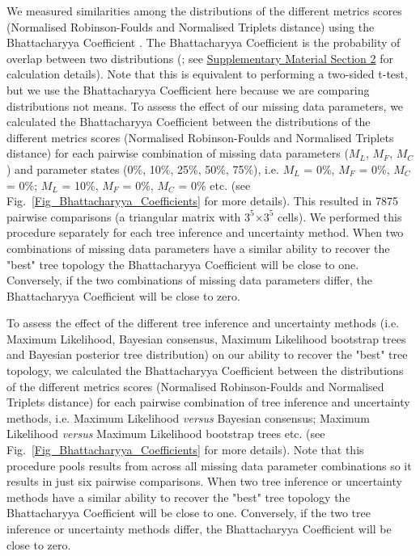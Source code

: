 \documentclass[12pt,letterpaper]{article}
\begin{document}
We measured similarities among the distributions of the different metrics scores (Normalised Robinson-Foulds and Normalised Triplets distance) using the Bhattacharyya Coefficient \citep{Bhattacharyya}. The Bhattacharyya Coefficient is the probability of overlap between two distributions (\citealt{Bhattacharyya}; see \hyperref[SupplementaryMaterial]{Supplementary Material Section 2} for calculation details). Note that this is  equivalent to performing a two-sided t-test, but we use the Bhattacharyya Coefficient here because we are comparing distributions not means. To assess the effect of our missing data parameters, we calculated the Bhattacharyya Coefficient between the distributions of the different metrics scores (Normalised Robinson-Foulds and Normalised Triplets distance) for each pairwise combination of missing data parameters ($M_{L}$, $M_{F}$, $M_{C}$) and parameter states (0\%, 10\%, 25\%, 50\%, 75\%), i.e. $M_{L}$ = 0\%, $M_{F}$ = 0\%, $M_{C}$ = 0\%; $M_{L}$ = 10\%, $M_{F}$ = 0\%, $M_{C}$ = 0\% etc. (see Fig.~\ref{Fig_Bhattacharyya_Coefficients} for more details). This resulted in 7875 pairwise comparisons (a triangular matrix with $3^5$$\times$$3^5$ cells). We performed this procedure separately for each tree inference and uncertainty method. When two combinations of missing data parameters have a similar ability to recover the "best" tree topology the Bhattacharyya Coefficient will be close to one. Conversely, if the two combinations of missing data parameters differ, the Bhattacharyya Coefficient will be close to zero.

To assess the effect of the different tree inference and uncertainty methods (i.e. Maximum Likelihood, Bayesian consensus, Maximum Likelihood bootstrap trees and Bayesian posterior tree distribution) on our ability to recover the "best" tree topology, we calculated the Bhattacharyya Coefficient between the distributions of the different metrics scores (Normalised Robinson-Foulds and Normalised Triplets distance) for each pairwise combination of tree inference and uncertainty methods, i.e. Maximum Likelihood \textit{versus} Bayesian consensus; Maximum Likelihood \textit{versus} Maximum Likelihood bootstrap trees etc. (see Fig.~\ref{Fig_Bhattacharyya_Coefficients} for more details). Note that this procedure pools results from across all missing data parameter combinations so it results in just six pairwise comparisons. When two tree inference or uncertainty methods have a similar ability to recover the "best" tree topology the Bhattacharyya Coefficient will be close to one. Conversely, if the two tree inference or uncertainty methods differ, the Bhattacharyya Coefficient will be close to zero.
\end{document}
